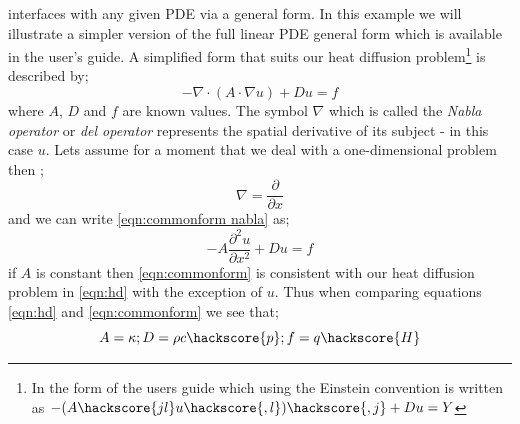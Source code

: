 \ESCRIPT interfaces with any given PDE via a general form. In this example we will illustrate a simpler version of the full linear PDE general form which is available in the \ESCRIPT user's guide. A simplified form that suits our heat diffusion problem\footnote{In the form of the \ESCRIPT users guide which using the Einstein convention is written as 
$-(A\hackscore{jl} u\hackscore{,l})\hackscore{,j}+D u =Y$}
is described by;
\begin{equation}\label{eqn:commonform nabla}
-\nabla\cdot(A\cdot\nabla u) + Du = f
\end{equation}
where $A$, $D$ and $f$ are known values. The symbol $\nabla$ which is called the \textit{Nabla operator} or \textit{del operator} represents
the spatial derivative of its subject - in this case $u$. Lets assume for a moment that we deal with a one-dimensional problem then ;
\begin{equation}
\nabla = \frac{\partial}{\partial x}
\end{equation}
and we can write \ref{eqn:commonform nabla} as;
\begin{equation}\label{eqn:commonform}
-A\frac{\partial^{2}u}{\partial x^{2}} + Du = f
\end{equation}
if $A$ is constant then  \ref{eqn:commonform} is consistent with our heat diffusion problem in \ref{eqn:hd} with the exception of $u$. Thus when comparing equations \ref{eqn:hd} and \ref{eqn:commonform} we see that;
\begin{equation}
A = \kappa; D = \rho c \hackscore{p}; f = q \hackscore{H}
\end{equation}

